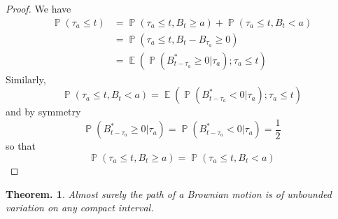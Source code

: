 \documentclass[11pt, a4paper]{memoir}
\theoremstyle{change}
\newtheorem{theorem}{Theorem.}[section]
\theoremstyle{plain}
\theoremstyle{nonumberplain}
\newtheorem{proof}{Proof}
\DeclareMathOperator{\pr}{{\mathbb{P}}}
\DeclareMathOperator{\E}{{\mathbb{E}}}
\numberwithin{equation}{section}
\begin{document}
\begin{proof}
    We have
    \begin{align*}
        \pr(\tau_a\leq t) &= \pr(\tau_a\leq t,B_t\geq a)+\pr(\tau_a\leq t, B_t<a)\\
                          &= \pr(\tau_a\leq t,B_t-B_{\tau_a}\geq 0)\\
                          &= \E(\pr(B^*_{t-\tau_a}\geq 0|\tau_a);\tau_a\leq t)
    \end{align*}
    Similarly,
    \begin{equation*}
        \pr(\tau_a\leq t,B_t<a) = \E(\pr(B^*_{t-\tau_a}<0|\tau_a);\tau_a\leq t)
    \end{equation*}
    and by symmetry
    \begin{equation*}
        \pr(B^*_{t-\tau_a}\geq 0|\tau_a)=\pr(B^*_{t-\tau_a}<0|\tau_a)=\frac{1}{2}
    \end{equation*}
    so that
    \begin{equation*}
        \pr(\tau_a\leq t,B_t\geq a)=\pr(\tau_a\leq t,B_t<a)
    \end{equation*}
\end{proof}
\begin{theorem}
    Almost surely the path of a Brownian motion is of unbounded variation on any compact interval.
\end{theorem}
\end{document}
